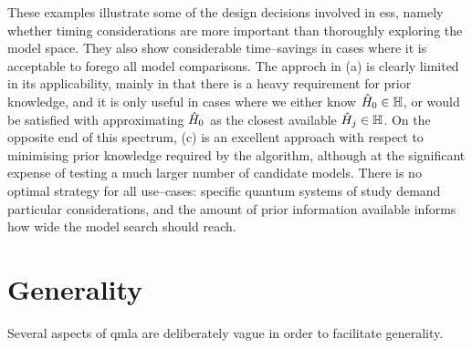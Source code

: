 These examples illustrate some of the design decisions involved in \gls{es}s, 
    namely whether timing considerations are more important than thoroughly exploring the model space.
They also show considerable time--savings in cases where it is
    acceptable to forego all model comparisons. 
The approch in (a) is clearly limited in its applicability, 
    mainly in that there is a heavy requirement for prior knowledge, 
    and it is only useful in cases where we either know $\hat{H}_0 \in \mathbb{H}$, 
    or would be satisfied with approximating $\hat{H}_0$ as the closest available $\hat{H}_j \in \mathbb{H}$. 
On the opposite end of this spectrum, (c) is an excellent approach
    with respect to minimising prior knowledge required by the algorithm, 
    although at the significant expense of testing a much larger number of candidate models. 
There is no optimal strategy for all use--cases: 
    specific quantum systems of study demand particular considerations, 
    and the amount of prior information available informs how wide the model search should reach. 

\par 


\section{Generality}
Several aspects of \gls{qmla} are deliberately vague in order to facilitate generality. 

